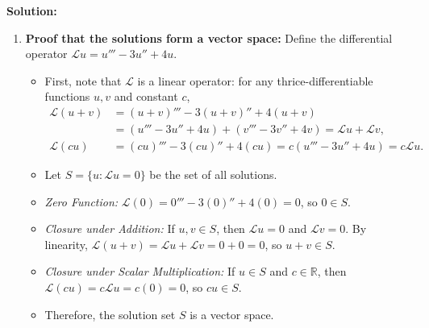 \documentclass[11pt,a4paper]{article}
\begin{document}
\textbf{Solution:}
\begin{enumerate}
    \item \textbf{Proof that the solutions form a vector space:}
    Define the differential operator $\mathcal{L}u = u''' - 3u'' + 4u$.
    \begin{itemize}
        \item First, note that $\mathcal{L}$ is a linear operator: for any thrice-differentiable functions $u, v$ and constant $c$,
        \begin{align*}
            \mathcal{L}(u + v) &= (u + v)''' - 3(u + v)'' + 4(u + v) \\
            &= (u''' - 3u'' + 4u) + (v''' - 3v'' + 4v) = \mathcal{L}u + \mathcal{L}v, \\
            \mathcal{L}(cu) &= (cu)''' - 3(cu)'' + 4(cu) = c(u''' - 3u'' + 4u) = c\mathcal{L}u.
        \end{align*}
        \item Let $S = \{u : \mathcal{L}u = 0\}$ be the set of all solutions.
        \item \emph{Zero Function:} $\mathcal{L}(0) = 0''' - 3(0)'' + 4(0) = 0$, so $0 \in S$.
        \item \emph{Closure under Addition:} If $u, v \in S$, then $\mathcal{L}u = 0$ and $\mathcal{L}v = 0$. By linearity, $\mathcal{L}(u + v) = \mathcal{L}u + \mathcal{L}v = 0 + 0 = 0$, so $u + v \in S$.
        \item \emph{Closure under Scalar Multiplication:} If $u \in S$ and $c \in \mathbb{R}$, then $\mathcal{L}(cu) = c\mathcal{L}u = c(0) = 0$, so $cu \in S$.
        \item Therefore, the solution set $S$ is a vector space.
    \end{itemize}


\end{enumerate}
\end{document}
